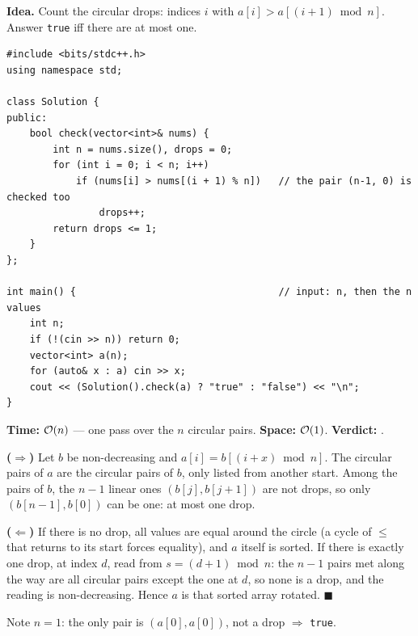 \begin{algorithmbox}
\textbf{Idea.} Count the circular drops: indices $i$ with $a[i] > a[(i+1) \bmod n]$. Answer \texttt{true} iff there are at most one.
\begin{lstlisting}[style=cpp]
#include <bits/stdc++.h>
using namespace std;

class Solution {
public:
    bool check(vector<int>& nums) {
        int n = nums.size(), drops = 0;
        for (int i = 0; i < n; i++)
            if (nums[i] > nums[(i + 1) % n])   // the pair (n-1, 0) is checked too
                drops++;
        return drops <= 1;
    }
};

int main() {                                   // input: n, then the n values
    int n;
    if (!(cin >> n)) return 0;
    vector<int> a(n);
    for (auto& x : a) cin >> x;
    cout << (Solution().check(a) ? "true" : "false") << "\n";
}
\end{lstlisting}
\begin{complexitybox}
\textbf{Time:} $\mathcal{O}(n)$ --- one pass over the $n$ circular pairs. \textbf{Space:} $\mathcal{O}(1)$. \textbf{Verdict:} \ac{}.
\end{complexitybox}
\end{algorithmbox}

\begin{invariantbox}
\textbf{($\Rightarrow$)} Let $b$ be non-decreasing and $a[i] = b[(i + x) \bmod n]$. The circular pairs of $a$ are the circular pairs of $b$, only listed from another start. Among the pairs of $b$, the $n-1$ linear ones $(b[j], b[j+1])$ are not drops, so only $(b[n-1], b[0])$ can be one: at most one drop.

\textbf{($\Leftarrow$)} If there is no drop, all values are equal around the circle (a cycle of $\le$ that returns to its start forces equality), and $a$ itself is sorted. If there is exactly one drop, at index $d$, read from $s = (d+1) \bmod n$: the $n-1$ pairs met along the way are all circular pairs except the one at $d$, so none is a drop, and the reading is non-decreasing. Hence $a$ is that sorted array rotated. \hfill$\blacksquare$

Note $n = 1$: the only pair is $(a[0], a[0])$, not a drop $\Rightarrow$ \texttt{true}.
\end{invariantbox}

